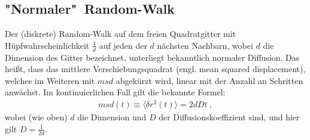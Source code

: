 \documentclass[a4paper, 12pt]{report}
\begin{document}
\subsection{"Normaler"\ Random-Walk}
Der (diskrete) Random-Walk auf dem freien Quadratgitter mit Hüpfwahrscheinlichkeit $\frac{1}{d}$ auf jeden der $d$ nächsten Nachbarn, wobei $d$ die Dimension des Gitter bezeichnet, unterliegt bekanntlich normaler Diffusion. Das heißt, dass das mittlere Verschiebungsquadrat (engl. mean squared displacement), welches im Weiteren mit $msd$ abgekürzt wird, linear mit der Anzahl an Schritten anwächst. Im kontinuierlichen Fall gilt die bekannte Formel:
\begin{align*}
msd(t)\equiv \langle \delta r^2 (t) \rangle =2dDt\ ,
\end{align*}
wobei (wie oben) $d$ die Dimension und $D$ der Diffusionskoeffizient sind, und hier gilt $D=\frac{1}{2d}$.
\end{document}
